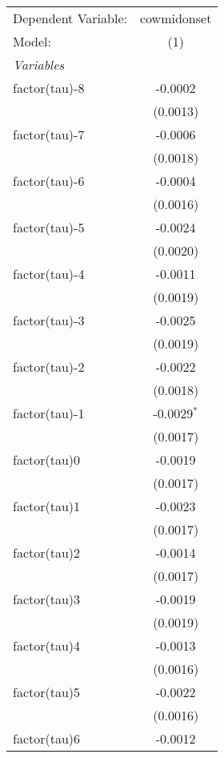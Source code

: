 
\begingroup
\centering
\begin{tabular}{lc}
   \tabularnewline \midrule \midrule
   Dependent Variable: & cowmidonset\\  
   Model:              & (1)\\  
   \midrule
   \emph{Variables}\\
   factor(tau)-8       & -0.0002\\   
                       & (0.0013)\\   
   factor(tau)-7       & -0.0006\\   
                       & (0.0018)\\   
   factor(tau)-6       & -0.0004\\   
                       & (0.0016)\\   
   factor(tau)-5       & -0.0024\\   
                       & (0.0020)\\   
   factor(tau)-4       & -0.0011\\   
                       & (0.0019)\\   
   factor(tau)-3       & -0.0025\\   
                       & (0.0019)\\   
   factor(tau)-2       & -0.0022\\   
                       & (0.0018)\\   
   factor(tau)-1       & -0.0029$^{*}$\\   
                       & (0.0017)\\   
   factor(tau)0        & -0.0019\\   
                       & (0.0017)\\   
   factor(tau)1        & -0.0023\\   
                       & (0.0017)\\   
   factor(tau)2        & -0.0014\\   
                       & (0.0017)\\   
   factor(tau)3        & -0.0019\\   
                       & (0.0019)\\   
   factor(tau)4        & -0.0013\\   
                       & (0.0016)\\   
   factor(tau)5        & -0.0022\\   
                       & (0.0016)\\   
   factor(tau)6        & -0.0012\\   

\end{tabular}
